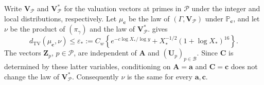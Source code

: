\documentclass[twoside]{aomart}
\makeatletter
\theoremstyle{paperplain}
\theoremstyle{paperdefinition}
\renewenvironment{proof}[1][\proofname]{\par\pushQED{\qed}%
  \normalfont\topsep6\p@\@plus3\p@\relax\trivlist
  \item[\hskip\labelsep\itshape #1\@addpunct{.}]\ignorespaces
}{\popQED\endtrivlist\@endpefalse}
\newcommand{\Pp}{\mathbb P}
\newcommand{\TV}{d_{\mathrm{TV}}}
\numberwithin{equation}{section}
\makeatother
\begin{document}
\begin{proof}
Write $\mathbf V_{\mathcal P}$ and $\mathbf V^*_{\mathcal P}$ for
the valuation vectors at primes in $\mathcal P$ under the integer
and local distributions, respectively.
Let $\mu_{\mathbf c}$ be the law of $(\Gamma,\mathbf V_{\mathcal P})$
under $\Pp_{\mathbf c}$, and let $\nu$ be the product of
$(\pi_\gamma)$ and the law of $\mathbf V^*_{\mathcal P}$.
 gives
\begin{equation}
 \TV(\mu_{\mathbf c},\nu)\le\varepsilon_*
 :=C_w\left\{e^{-c\log X_*/\log y}
          +X_*^{-1/2}(1+\log X_*)^{16}\right\}.
 \label{ar:conditional-joint-valuation-error}
\end{equation}
The vectors $\mathbf Z_p$, $p\in\mathcal P$, are independent of
$\mathbf A$ and $(\mathbf U_p)_{p\in\mathcal B}$.
Since $\mathbf C$ is determined by these latter variables,
conditioning on $\mathbf A=\mathbf a$ and $\mathbf C=\mathbf c$
does not change the law of $\mathbf V^*_{\mathcal P}$.
Consequently $\nu$ is the same for every $\mathbf a,\mathbf c$.


\end{proof}
\end{document}
